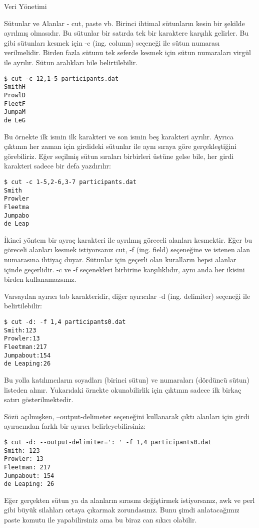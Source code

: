 \begin{section}{Veri Yönetimi}
\begin{subsection}{Sütunlar ve Alanlar - cut, paste vb.}
Birinci ihtimal sütunların kesin bir şekilde ayrılmış olmasıdır. Bu sütunlar bir satırda tek bir karaktere karşılık gelirler. Bu gibi sütunları kesmek için -c (ing. column) seçeneği ile sütun numarası verilmelidir. Birden fazla sütunu tek seferde kesmek için sütun numaraları virgül ile ayrılır. Sütun aralıkları bile belirtilebilir.
\begin{verbatim}
$ cut -c 12,1-5 participants.dat
SmithH 
ProwlD 
FleetF 
JumpaM 
de LeG 
\end{verbatim}

Bu örnekte ilk ismin ilk karakteri ve son ismin beş karakteri ayrılır. Ayrıca çıktının her zaman için girdideki sütunlar ile aynı sıraya göre gerçekleştiğini görebiliriz. Eğer seçilmiş sütun sıraları birbirleri üstüne gelse bile, her girdi karakteri sadece bir defa yazdırılır:

\begin{verbatim}
$ cut -c 1-5,2-6,3-7 participants.dat
Smith 
Prowler 
Fleetma 
Jumpabo 
de Leap
\end{verbatim}

İkinci yöntem bir ayraç karakteri ile ayrılmış göreceli alanları kesmektir. Eğer bu göreceli alanları kesmek istiyorsanız cut, -f (ing. field) seçeneğine ve istenen alan numarasına ihtiyaç duyar. Sütunlar için geçerli olan kuralların hepsi alanlar içinde geçerlidir. -c ve -f seçenekleri birbirine karşılıklıdır, aynı anda her ikisini birden kullanamazsınız.

Varsayılan ayırıcı tab karakteridir, diğer ayırıcılar -d (ing. delimiter) seçeneği ile belirtilebilir:

\begin{verbatim}
$ cut -d: -f 1,4 participants0.dat
Smith:123 
Prowler:13 
Fleetman:217 
Jumpabout:154 
de Leaping:26
\end{verbatim}

Bu yolla katılımcıların soyadları (birinci sütun) ve numaraları (dördüncü sütun) listeden alınır. Yukarıdaki örnekte okunabilirlik için çıktının sadece ilk birkaç satırı gösterilmektedir.

Sözü açılmışken, --output-delimeter seçeneğini kullanarak çıktı alanları için girdi ayıracından farklı bir ayırıcı belirleyebilirsiniz:

\begin{verbatim}
$ cut -d: --output-delimiter=': ' -f 1,4 participants0.dat
Smith: 123
Prowler: 13
Fleetman: 217
Jumpabout: 154
de Leaping: 26
\end{verbatim}

Eğer gerçekten sütun ya da alanların sırasını değiştirmek istiyorsanız, awk ve perl gibi büyük silahları ortaya çıkarmak zorundasınız. Bunu şimdi anlatacağımız paste komutu ile yapabilirsiniz ama bu biraz can sıkıcı olabilir.


\end{subsection}
\end{section}
